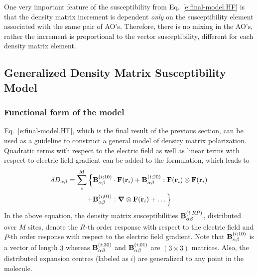\documentclass[aip,amsmath,amssymb,reprint]{revtex4-1}
\newcommand{\BM}[1]{\bm{#1}}
\begin{document}
One very important feature of the susceptibility from Eq.~\eqref{e:final-model.HF} is that
the density matrix increment is dependent \emph{only} on the susceptibility element associated with the same
pair of AO's. Therefore, there is no mixing in the AO's, rather the increment is proportional to the 
vector susceptibility, different for each density matrix element.

\subsection{Generalized Density Matrix Susceptibility Model}

\subsubsection{Functional form of the model}

Eq.~\eqref{e:final-model.HF}, which is the final result of the previous section, 
can be used as a guideline to construct a general model of density matrix polarization.
Quadratic terms with respect to the electric field as well as linear terms with respect to
electric field gradient can be added to the formulation, which leads to
%
\begin{multline}\label{e:final-model.General}
 \delta D_{\alpha\beta} = \sum_{i }^M \Big\{
                                      {\bf B}^{(i ; 10)}_{\alpha\beta} \cdot {\bf F}({\bf r}_i)  
                        +             {\bf B}^{(i ; 20)}_{\alpha\beta} : {\bf F}({\bf r}_i) \otimes {\bf F}({\bf r}_i) \\
                        +             {\bf B}^{(i ; 01)}_{\alpha\beta} : {\BM\nabla} \otimes {\bf F}({\bf r}_i) 
                        + \ldots \Big\}
\end{multline}
%
In the above equation, the density matrix susceptibilities
${\bf B}^{(i; RP)}_{\alpha\beta}$, distributed over $M$ sites,
denote the $R$-th order response with respect to the electric field
and $P$-th order response with respect to the electric field gradient. Note that
${\bf B}^{(i; 10)}_{\alpha\beta}$ is a vector of length $3$ whereas ${\bf B}^{(i; 20)}_{\alpha\beta}$
and ${\bf B}^{(i; 01)}_{\alpha\beta}$ are $(3\times 3)$ matrices. Also, the distributed expansion centres
(labeled as $i$) are generalized to any point in the molecule.
\end{document}
